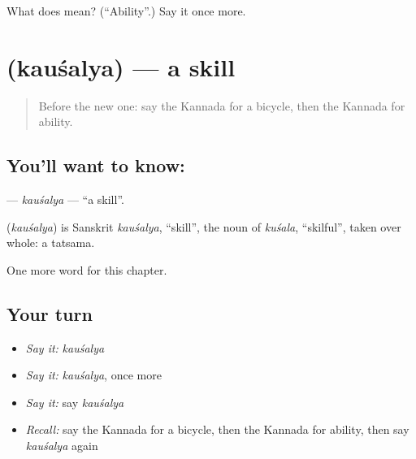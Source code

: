 \begin{tcolorbox}[breakable,colback=teal!4,colframe=teal!35!black,title={Before you move on}]
What does  mean? (\textquotedblleft{}Ability\textquotedblright{}.) Say it once more.
\end{tcolorbox}
\section[\texorpdfstring{\kn{ಕೌಶಲ್ಯ} (kauśalya)}{ಕೌಶಲ್ಯ (kauśalya)}]{ (kauśalya) — a skill}

\label{lesson:KA-C112-kausalya}



\begin{quote}
Before the new one: say the Kannada for a bicycle, then the Kannada for ability.
\end{quote}

\subsection*{You'll want to know: }
\textbf{} — \emph{kauśalya} — \textquotedblleft{}a skill\textquotedblright{}.

\begin{cousinweb}
\textbf{} (\emph{kauśalya}) is Sanskrit \emph{kauśalya}, \textquotedblleft{}skill\textquotedblright{}, the noun of \emph{kuśala}, \textquotedblleft{}skilful\textquotedblright{}, taken over whole: a tatsama.
\end{cousinweb}

\begin{grammarlens}[title={What you've built}]
One more word for this chapter.
\end{grammarlens}

\subsection*{Your turn}
\begin{itemize}
\raggedright
  \item \emph{Say it:} \emph{kauśalya}
  \item \emph{Say it:} \emph{kauśalya}, once more
  \item \emph{Say it:} say \emph{kauśalya}
  \item \emph{Recall:} say the Kannada for a bicycle, then the Kannada for ability, then say \emph{kauśalya} again
\end{itemize}

